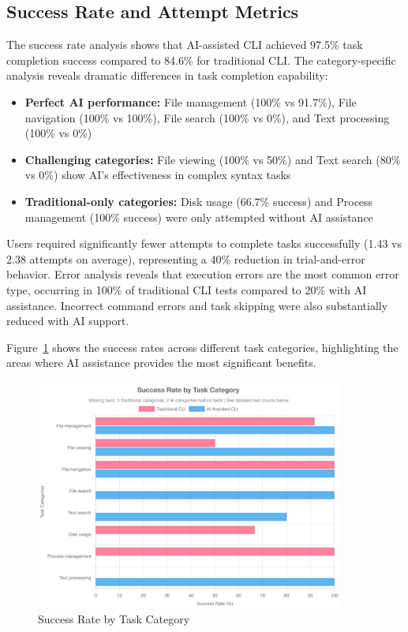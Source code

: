 \subsection{Success Rate and Attempt Metrics}

The success rate analysis shows that AI-assisted CLI achieved 97.5\% task completion success compared to 84.6\% for traditional CLI. The category-specific analysis reveals dramatic differences in task completion capability:

\begin{itemize}
	\item \textbf{Perfect AI performance:} File management (100\% vs 91.7\%), File navigation (100\% vs 100\%), File search (100\% vs 0\%), and Text processing (100\% vs 0\%)
	\item \textbf{Challenging categories:} File viewing (100\% vs 50\%) and Text search (80\% vs 0\%) show AI's effectiveness in complex syntax tasks
	\item \textbf{Traditional-only categories:} Disk usage (66.7\% success) and Process management (100\% success) were only attempted without AI assistance
\end{itemize}

Users required significantly fewer attempts to complete tasks successfully (1.43 vs 2.38 attempts on average), representing a 40\% reduction in trial-and-error behavior. Error analysis reveals that execution errors are the most common error type, occurring in 100\% of traditional CLI tests compared to 20\% with AI assistance. Incorrect command errors and task skipping were also substantially reduced with AI support.

Figure~\ref{fig:category_performance} shows the success rates across different task categories, highlighting the areas where AI assistance provides the most significant benefits.

\begin{figure}[h]
	\centering
	\includegraphics[width=0.9\textwidth]{assets/figures/category_performance_horizontal.pdf}
	\caption{Success Rate by Task Category}
	\label{fig:category_performance}
\end{figure}


